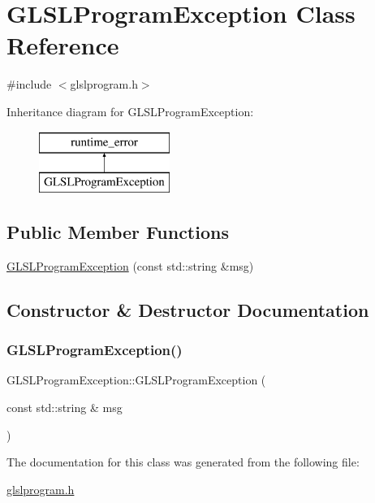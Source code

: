 \hypertarget{class_g_l_s_l_program_exception}{}\section{G\+L\+S\+L\+Program\+Exception Class Reference}
\label{class_g_l_s_l_program_exception}


{\ttfamily \#include $<$glslprogram.\+h$>$}

Inheritance diagram for G\+L\+S\+L\+Program\+Exception\+:\begin{figure}[H]
\begin{center}
\leavevmode
\includegraphics[height=2.000000cm]{class_g_l_s_l_program_exception}
\end{center}
\end{figure}
\subsection*{Public Member Functions}
\begin{DoxyCompactItemize}
\item 
\mbox{\hyperlink{class_g_l_s_l_program_exception_a9a184dd1dd7451e7103ef942342e2326}{G\+L\+S\+L\+Program\+Exception}} (const std\+::string \&msg)
\end{DoxyCompactItemize}


\subsection{Constructor \& Destructor Documentation}
\mbox{\label{class_g_l_s_l_program_exception_a9a184dd1dd7451e7103ef942342e2326}} 
\subsubsection{\texorpdfstring{GLSLProgramException()}{GLSLProgramException()}}
{\footnotesize\ttfamily G\+L\+S\+L\+Program\+Exception\+::\+G\+L\+S\+L\+Program\+Exception (\begin{DoxyParamCaption}\item[{const std\+::string \&}]{msg }\end{DoxyParamCaption})\hspace{0.3cm}{\ttfamily [inline]}}



The documentation for this class was generated from the following file\+:\begin{DoxyCompactItemize}
\item 
\mbox{\hyperlink{glslprogram_8h}{glslprogram.\+h}}\end{DoxyCompactItemize}
